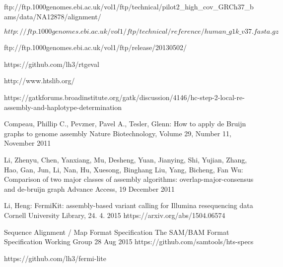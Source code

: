 


\renewcommand{\bibname}{References}

% 


\begin{thebibliography}{99}

 ftp://ftp.1000genomes.ebi.ac.uk/vol1/ftp/technical/pilot2\_high\_cov\_GRCh37\_bams/data/NA12878/alignment/

$http://ftp.1000genomes.ebi.ac.uk/vol1/ftp/technical/reference/human\_g1k\_v37.fasta.gz$

ftp://ftp.1000genomes.ebi.ac.uk/vol1/ftp/release/20130502/

https://github.com/lh3/rtgeval

http://www.htslib.org/

https://gatkforums.broadinstitute.org/gatk/discussion/4146/hc-step-2-local-re-assembly-and-haplotype-determination

Compeau, Phillip C., Pevzner, Pavel A., Tesler, Glenn:
How to apply de Bruijn graphs to genome assembly
Nature Biotechnology, Volume 29, Number 11, November 2011

Li, Zhenyu, Chen, Yanxiang, Mu, Desheng, Yuan, Jianying, Shi, Yujian, Zhang, Hao, Gan, Jun, Li, Nan, Hu, Xuesong, Binghang Liu, Yang, Bicheng, Fan Wu:
Comparison of two major classes of assembly algorithms: overlap-major-consensus and de-bruijn graph
Advance Access, 19 December 2011

Li, Heng: FermiKit: assembly-based variant calling for Illumina resequencing data
Cornell University Library, 24. 4. 2015
https://arxiv.org/abs/1504.06574

Sequence Alignment / Map Format Specification
The SAM/BAM Format Specification Working Group
28 Aug 2015
https://github.com/samtools/hts-specs

https://github.com/lh3/fermi-lite


\end{thebibliography}
